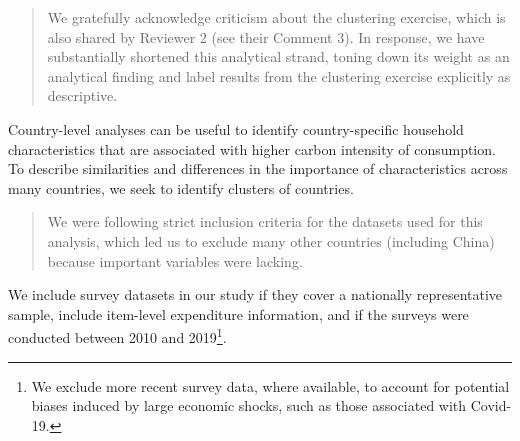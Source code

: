\documentclass[11pt]{article}
\newenvironment{response}
{\begin{quote}\color{black}}
{\end{quote}}
\begin{document}
\begin{response}
    We gratefully acknowledge criticism about the clustering exercise, which is also shared by Reviewer 2 (see their Comment 3). In response, we have substantially shortened this analytical strand, toning down its weight as an analytical finding and label results from the clustering exercise explicitly as descriptive.

    \end{response}

    \begin{revisionbox}
        Country-level analyses can be useful to identify country-specific household characteristics that are associated with higher carbon intensity of consumption. To describe similarities and differences in the importance of characteristics across many countries, we seek to identify clusters of countries. 
    \end{revisionbox}

    \begin{response}
    We were following strict inclusion criteria for the datasets used for this analysis, which led us to exclude many other countries (including China) because important variables were lacking.
    \end{response}

    \begin{revisionbox}
    We include survey datasets in our study if they cover a nationally representative sample, include item-level expenditure information, and if the surveys were conducted between 2010 and 2019\footnote{We exclude more recent survey data, where available, to account for potential biases induced by large economic shocks, such as those associated with Covid-19.}.
    \end{revisionbox}
\end{document}
